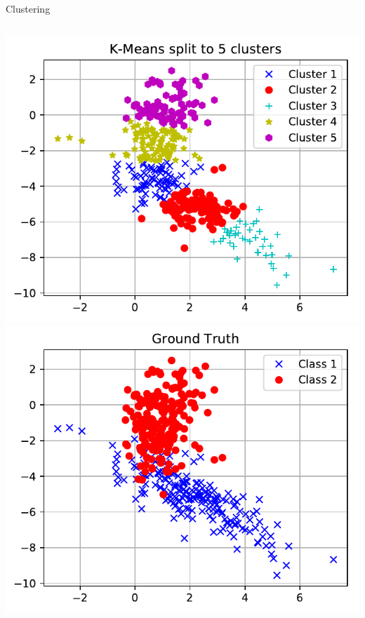 \documentclass[10pt, aspectratio=169]{beamer} %
\begin{document}
\begin{frame}[fragile, allowframebreaks=0.8]{Clustering}
\begin{columns}
\begin{center}
			\includegraphics[width=0.5\columnwidth]{kmeans_5.pdf}
			\includegraphics[width=0.5\columnwidth]{kmeans_true.pdf}
		\end{center}
		\end{columns}
\end{frame}
\end{document}
